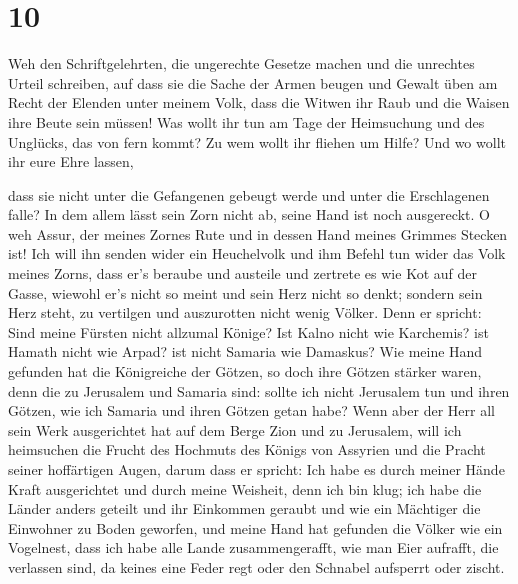 \hypertarget{section-9}{%
\section{10}\label{section-9}}

 Weh den Schriftgelehrten, die ungerechte Gesetze machen
und die unrechtes Urteil schreiben,  auf dass sie die
Sache der Armen beugen und Gewalt üben am Recht der Elenden unter meinem
Volk, dass die Witwen ihr Raub und die Waisen ihre Beute sein müssen!
 Was wollt ihr tun am Tage der Heimsuchung und des
Unglücks, das von fern kommt? Zu wem wollt ihr fliehen um Hilfe? Und wo
wollt ihr eure Ehre lassen,

 dass sie nicht unter die Gefangenen gebeugt werde und
unter die Erschlagenen falle? In dem allem lässt sein Zorn nicht ab,
seine Hand ist noch ausgereckt.  O weh Assur, der meines
Zornes Rute und in dessen Hand meines Grimmes Stecken ist!
 Ich will ihn senden wider ein Heuchelvolk und ihm Befehl
tun wider das Volk meines Zorns, dass er's beraube und austeile und
zertrete es wie Kot auf der Gasse,  wiewohl er's nicht so
meint und sein Herz nicht so denkt; sondern sein Herz steht, zu
vertilgen und auszurotten nicht wenig Völker.  Denn er
spricht: Sind meine Fürsten nicht allzumal Könige?  Ist
Kalno nicht wie Karchemis? ist Hamath nicht wie Arpad? ist nicht Samaria
wie Damaskus?  Wie meine Hand gefunden hat die
Königreiche der Götzen, so doch ihre Götzen stärker waren, denn die zu
Jerusalem und Samaria sind:  sollte ich nicht Jerusalem
tun und ihren Götzen, wie ich Samaria und ihren Götzen getan habe?
 Wenn aber der Herr all sein Werk ausgerichtet hat auf
dem Berge Zion und zu Jerusalem, will ich heimsuchen die Frucht des
Hochmuts des Königs von Assyrien und die Pracht seiner hoffärtigen
Augen,  darum dass er spricht: Ich habe es durch meiner
Hände Kraft ausgerichtet und durch meine Weisheit, denn ich bin klug;
ich habe die Länder anders geteilt und ihr Einkommen geraubt und wie ein
Mächtiger die Einwohner zu Boden geworfen,  und meine
Hand hat gefunden die Völker wie ein Vogelnest, dass ich habe alle Lande
zusammengerafft, wie man Eier aufrafft, die verlassen sind, da keines
eine Feder regt oder den Schnabel aufsperrt oder zischt.

